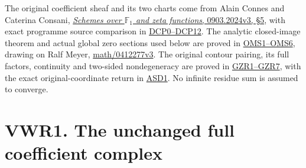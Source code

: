 The original coefficient sheaf and its two charts come from Alain Connes
and Caterina Consani,
\href{https://arxiv.org/abs/0903.2024v3}{\emph{Schemes over
\(\mathbb F_1\) and zeta functions}, 0903.2024v3, §5}, with exact
programme source comparison in
\href{https://github.com/KokunoYumeto/zeta-function-research-reader/blob/36a82ecca98addb8a98b48204e349737856c7223/workbenches/splitzero-tandem/continuations/20260924-cohomology-weight-and-character-lifts/original-character-lifting/tau_lifting_weights_20260924/SOURCE_CC_DOUBLE_PULLBACK.md}{DCP0--DCP12}.
The analytic closed-image theorem and actual global zero sections used
below are proved in
\href{https://github.com/KokunoYumeto/zeta-function-research-reader/blob/36a82ecca98addb8a98b48204e349737856c7223/workbenches/splitzero-tandem/continuations/20260924-cohomology-weight-and-character-lifts/original-character-lifting/tau_lifting_weights_20260924/ORIGINAL_MELLIN_SPECTRAL_SYNTHESIS.md}{OMS1--OMS6},
drawing on Ralf Meyer,
\href{https://arxiv.org/abs/math/0412277v3}{math/0412277v3}. The
original contour pairing, its full factors, continuity and two-sided
nondegeneracy are proved in
\href{https://github.com/KokunoYumeto/zeta-function-research-reader/blob/36a82ecca98addb8a98b48204e349737856c7223/workbenches/splitzero-tandem/continuations/20260924-cohomology-weight-and-character-lifts/original-character-lifting/tau_lifting_weights_20260924/GLOBAL_ORIGINAL_ZETA_RESIDUE_DUALITY_INDEPENDENT.md}{GZR1--GZR7},
with the exact original-coordinate return in
\href{https://github.com/KokunoYumeto/zeta-function-research-reader/blob/36a82ecca98addb8a98b48204e349737856c7223/workbenches/splitzero-tandem/continuations/20260924-cohomology-weight-and-character-lifts/original-character-lifting/tau_lifting_weights_20260924/ACTUAL_SUPPORTED_DUALITY_INDEPENDENT.md}{ASD1}.
No infinite residue sum is assumed to converge.

\section{VWR1. The unchanged full coefficient
complex}\label{vwr1.-the-unchanged-full-coefficient-complex}

